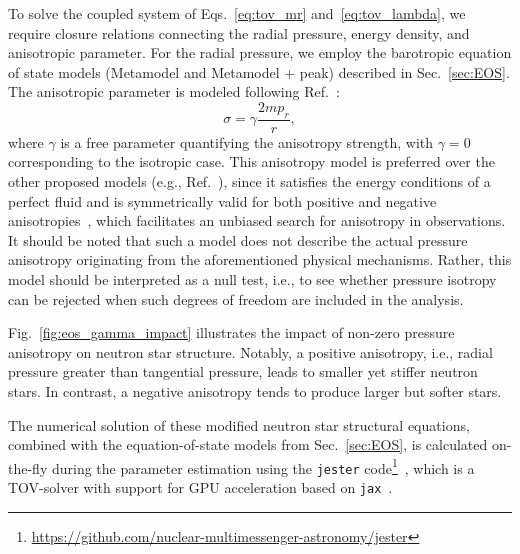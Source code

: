 \documentclass[prd,twocolumn,a4paper,floatfix,nofootinbib,preprintnumbers,superscriptaddress]{revtex4-1}
\begin{document}
To solve the coupled system of Eqs.~\eqref{eq:tov_mr} and~\eqref{eq:tov_lambda}, we require closure relations connecting the radial pressure, energy density, and anisotropic parameter. For the radial pressure, we employ the barotropic equation of state models (Metamodel and Metamodel + peak) described in Sec.~\ref{sec:EOS}. The anisotropic parameter is modeled following Ref.~\cite{Doneva:2012rd}:
\begin{equation}\label{eq: definition of gamma}
    \sigma = \gamma\frac{2mp_r}{r},
\end{equation}
where $\gamma$ is a free parameter quantifying the anisotropy strength, with $\gamma=0$ corresponding to the isotropic case. This anisotropy model is preferred over the other proposed models (e.g., Ref.~\cite{Bowers:1974tgi,Herrera:2013fja}), since it satisfies the energy conditions of a perfect fluid and is symmetrically valid for both positive and negative anisotropies~\cite{Setiawan:2019ojj}, which facilitates an unbiased search for anisotropy in observations. It should be noted that such a model does not describe the actual pressure anisotropy originating from the aforementioned physical mechanisms. Rather, this model should be interpreted as a null test, i.e., to see whether pressure isotropy can be rejected when such degrees of freedom are included in the analysis.

Fig.~\ref{fig:eos_gamma_impact} illustrates the impact of non-zero pressure anisotropy on neutron star structure. Notably, a positive anisotropy, i.e., radial pressure greater than tangential pressure, leads to smaller yet stiffer neutron stars. In contrast, a negative anisotropy tends to produce larger but softer stars.

The numerical solution of these modified neutron star structural equations, combined with the equation-of-state models from Sec.~\ref{sec:EOS}, is calculated on-the-fly during the parameter estimation using the \texttt{jester} code\footnote{\url{https://github.com/nuclear-multimessenger-astronomy/jester}}~\cite{Wouters:2025zju}, which is a TOV-solver with support for GPU acceleration based on \texttt{jax}~\cite{frostig2018compiling, kidger2021on}.
\end{document}
